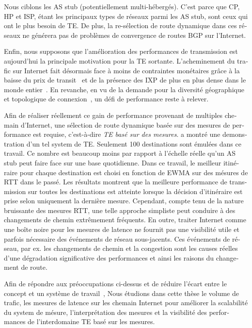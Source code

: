 \begin{otherlanguage}{french}
Nous ciblons les \acf{AS} stub (potentiellement multi-hébergés).
C'est parce que \acf{CP}, \acf{HP} et \acf{ISP}, étant les principaux types de réseaux parmi les AS stub, sont ceux qui ont le plus besoin de TE.
De plus, la re-sélection de route dynamique dans ces réseaux ne générera pas de problèmes de convergence de routes BGP sur l'Internet.

Enfin, nous supposons que l'amélioration des performances de transmission est aujourd'hui la principale motivation pour la TE sortante.
L'acheminement du trafic sur Internet fait désormais face à moins de contraintes monétaires grâce à la baisse du prix de transit~\cite{transitprice, drpeering} et de la présence des \ac{IXP} de plus en plus dense dans le monde entier~\cite{pchixp}.
En revanche, en vu de la demande pour la diversité géographique et topologique de connexion~\cite {Chiu2015}, un défi de performance reste à relever.

Afin de réaliser réellement ce gain de performance provenant de multiples chemain d'Internet, une sélection de route dynamique basée sur des mesures de performance est requise, c'est-à-dire \textit{TE basé sur des mesures}.
\citet{Akella2008} a montré une demonstration d'un tel system de TE.
Seulement 100 destinations sont émulées dans ce travail.
Ce nombre est beaucoup moins par rapport à l'échelle réelle qu'un AS stub peut faire face sur une base quotidienne.
Dans ce travail, le meilleur itinéraire pour chaque destination est choisi en fonction de \ac{EWMA} sur des mésures de \acf {RTT} dans le passé.
Les résultats montrent que la meilleure performance de transmission sur toutes les destinations est atteinte lorsque la décision d'itinéraire est prise selon uniquement la dernière mesure.
Cependant, compte tenu de la nature bruissante des mesures \ac{RTT}, une telle approche simpliste peut conduire à des changements de chemin extrêmement fréquents.
En outre, traiter Internet comme une boîte noire pour les mesures de latence ne fournit pas une visibilité utile et parfois nécessaire des événements de réseau sous-jacents.
Ces événements de réseau, par ex. les changements de chemin et la congestion sont les causes réelles d'une dégradation significative des performances et ainsi les raisons du changement de route.

Afin de répondre aux préoccupations ci-dessus et de réduire l'écart entre le concept et un système de travail~\cite{b6},
Nous étudions dans cette thèse le volume de trafic, les mesures de latence sur les chemain Internet pour améliorer la scalabilité du system de mésure, l'interprétation des mesures et la visibilité des performances de l'interdomaine TE basé sur les mesures.


\end{otherlanguage}
